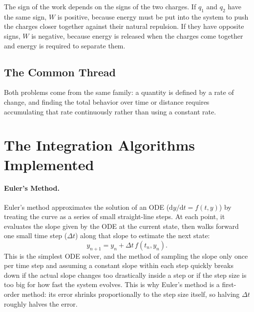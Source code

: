 \documentclass[11pt]{article}
\newcommand{\dd}{\mathrm{d}}
\begin{document}
The sign of the work depends on the signs of the two charges. If $q_1$ and $q_2$ have the same sign, $W$ is positive, because energy must be put into the system to push the charges closer together against their natural repulsion. If they have opposite signs, $W$ is negative, because energy is released when the charges come together and energy is required to separate them.

\subsection{The Common Thread}

Both problems come from the same family: a quantity is defined by a rate of change, and finding the total behavior over time or distance requires accumulating that rate continuously rather than using a constant rate.

\section{The Integration Algorithms Implemented}

\paragraph{Euler's Method.} Euler's method approximates the solution of an ODE ($\dd y/\dd t = f(t,y)$) by treating the curve as a series of small straight-line steps. At each point, it evaluates the slope given by the ODE at the current state, then walks forward one small time step ($\Delta t$) along that slope to estimate the next state:
\begin{equation}
  y_{n+1} = y_n + \Delta t\, f(t_n, y_n).
\end{equation}
This is the simplest ODE solver, and the method of sampling the slope only once per time step and assuming a constant slope within each step quickly breaks down if the actual slope changes too drastically inside a step or if the step size is too big for how fast the system evolves. This is why Euler's method is a first-order method: its error shrinks proportionally to the step size itself, so halving $\Delta t$ roughly halves the error.
\end{document}

